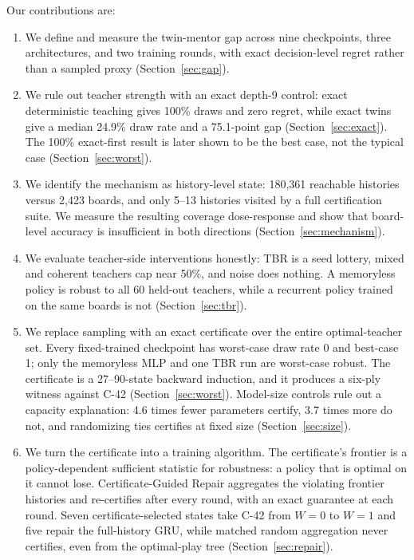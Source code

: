 \documentclass[conference]{IEEEtran}
\begin{document}
Our contributions are:
\begin{enumerate}
\item We define and measure the twin-mentor gap across nine checkpoints, three architectures, and two training rounds, with exact decision-level regret rather than a sampled proxy (Section~\ref{sec:gap}).
\item We rule out teacher strength with an exact depth-9 control: exact deterministic teaching gives 100\% draws and zero regret, while exact twins give a median 24.9\% draw rate and a 75.1-point gap (Section~\ref{sec:exact}). The 100\% exact-first result is later shown to be the best case, not the typical case (Section~\ref{sec:worst}).
\item We identify the mechanism as history-level state: 180{,}361 reachable histories versus 2{,}423 boards, and only 5--13 histories visited by a full certification suite. We measure the resulting coverage dose-response and show that board-level accuracy is insufficient in both directions (Section~\ref{sec:mechanism}).
\item We evaluate teacher-side interventions honestly: TBR is a seed lottery, mixed and coherent teachers cap near 50\%, and noise does nothing. A memoryless policy is robust to all 60 held-out teachers, while a recurrent policy trained on the same boards is not (Section~\ref{sec:tbr}).
\item We replace sampling with an exact certificate over the entire optimal-teacher set. Every fixed-trained checkpoint has worst-case draw rate 0 and best-case 1; only the memoryless MLP and one TBR run are worst-case robust. The certificate is a 27--90-state backward induction, and it produces a six-ply witness against C-42 (Section~\ref{sec:worst}). Model-size controls rule out a capacity explanation: 4.6 times fewer parameters certify, 3.7 times more do not, and randomizing ties certifies at fixed size (Section~\ref{sec:size}).
\item We turn the certificate into a training algorithm. The certificate's frontier is a policy-dependent sufficient statistic for robustness: a policy that is optimal on it cannot lose. Certificate-Guided Repair aggregates the violating frontier histories and re-certifies after every round, with an exact guarantee at each round. Seven certificate-selected states take C-42 from $W=0$ to $W=1$ and five repair the full-history GRU, while matched random aggregation never certifies, even from the optimal-play tree (Section~\ref{sec:repair}).

\end{enumerate}
\end{document}
